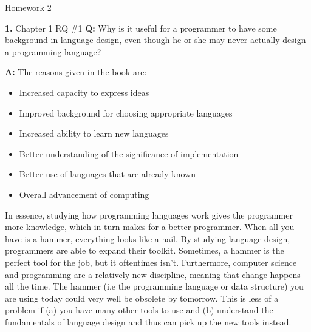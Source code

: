 \documentclass[letterpaper, 11pt]{article}
\newcommand{\hwnumbersec}[3]{\medskip \noindent\textbf{#1.} Chapter #2 #3
\newcommand{\ans}{\noindent\textbf{A:} }
\newline\noindent\textbf{Q:}}
\begin{document}
\begin{center}
	{\LARGE Homework 2}\\
\end{center}

\hwnumbersec{1}{1}{RQ \#1}
Why is it useful for a programmer to have some background in language design,
even though he or she may never actually design a programming language?

\ans The reasons given in the book are: 
\begin{itemize}
\item Increased capacity to express ideas
\item Improved background for choosing appropriate languages
\item Increased ability to learn new languages
\item Better understanding of the significance of implementation
\item Better use of languages that are already known
\item Overall advancement of computing
\end{itemize}

In essence, studying how programming languages work gives the programmer more
knowledge, which in turn makes for a better programmer. When all you have is a
hammer, everything looks like a nail. By studying language design, programmers
are able to expand their toolkit. Sometimes, a hammer is the perfect tool for
the job, but it oftentimes isn't. Furthermore, computer science and programming
are a relatively new discipline, meaning that change happens all the time. The
hammer (i.e the programming language or data structure) you are using today
could very well be obsolete by tomorrow. This is less of a problem if (a) you
have many other tools to use and (b) understand the fundamentals of language
design and thus can pick up the new tools instead.  
\end{document}

